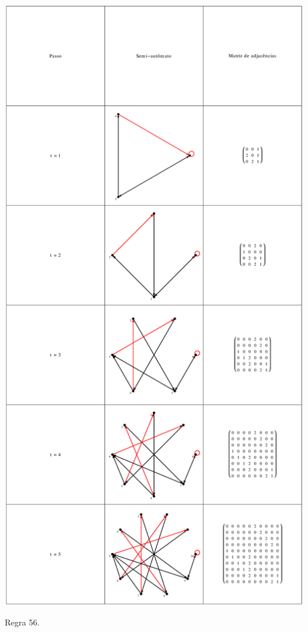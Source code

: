 \documentclass[12pt,a4paper]{article}
\begin{document}
\begin{table}[H]
\begin{center}
\includegraphics[scale=0.32]{img/mat/matr56.eps}
\caption{Regra 56.}
\label{tab:mr56}
\end{center}
\end{table}
\end{document}
